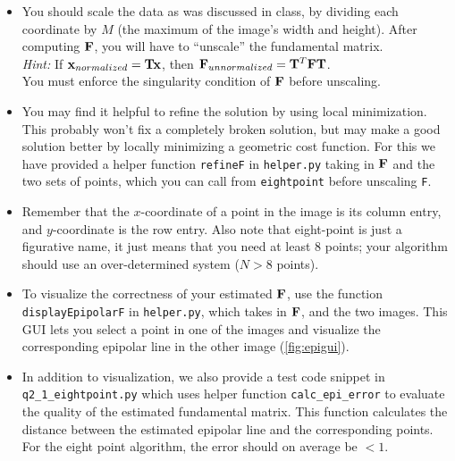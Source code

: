 \begin{itemize}
    \item You should scale the data as was discussed in class, by dividing each coordinate by $M$ (the maximum of the image's width and height). After computing ${\bf F}$, you will have to ``unscale'' the fundamental matrix.
    \\\emph{Hint:} If ${\bf x}_{normalized} = {\bf T}{\bf x}$, then ${\bf F}_{unnormalized} = {\bf T}^T {\bf F} {\bf T}$.
    \\You must enforce the singularity condition of ${\bf F}$ before unscaling.

    \item You may find it helpful to refine the solution by using local minimization.  This probably won't fix a completely broken solution, but may make a good solution better by locally minimizing a geometric cost function. For this we have provided a helper function \texttt{refineF} in \texttt{helper.py} taking in ${\bf F}$ and the two sets of points, which you can call from \texttt{eightpoint} before unscaling \texttt{F}.

    \item Remember that the $x$-coordinate of a point in the image is its column entry, and $y$-coordinate is the row entry. Also note that eight-point is just a figurative name, it just means that you need at least 8 points; your algorithm should use an over-determined system ($N>8$ points).

    \item To visualize the correctness of your estimated ${\bf F}$, use the function \texttt{displayEpipolarF} in \texttt{helper.py}, which takes in ${\bf F}$, and the two images. This GUI lets you select a point in one of
    the images and visualize the corresponding epipolar line in the other image (\autoref{fig:epigui}).
    
    \item In addition to visualization, we also provide a test code snippet in \texttt{q2\_1\_eightpoint.py} which uses helper function \texttt{calc\_epi\_error} to evaluate the quality of the estimated fundamental matrix. This function calculates the distance between the estimated epipolar line and the corresponding points. For the eight point algorithm, the error should on average be $< 1$. 

\end{itemize}


